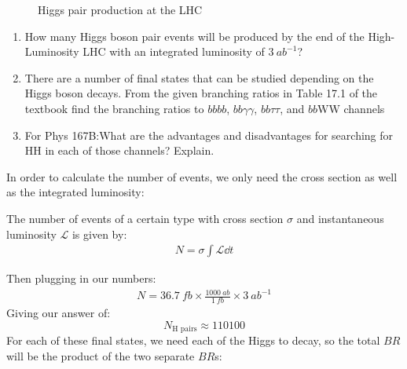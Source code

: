 \documentclass[12pt]{article}
\renewcommand{\L}{\mathcal{L}}
\newenvironment{thebook}
{\begin{mdframed}[style=defstyle,frametitle={From the Book}]}{\end{mdframed}}
\numberwithin{equation}{section}
\begin{document}
\begin{problem}
\begin{figure}[H]
    \caption{Higgs pair production at the LHC}\label{fig:t1}
  \end{figure}
  \begin{enumerate}
  \item How many Higgs boson pair events  will be produced by the end of the High-Luminosity LHC with an integrated luminosity of $\SI{3}{ab^{-1}}$?
  \item There are a number of final states that can be studied depending on the Higgs boson  decays. From the given branching ratios in Table 17.1 of the textbook find the branching ratios to $bbbb$, $bb\gamma\gamma$, $bb\tau\tau$, and $bb\mathrm{WW}$ channels
  \item For Phys 167B:\@ What are the advantages and disadvantages for searching for $\mathrm{HH}$ in each of those channels? Explain.
  \end{enumerate}
\end{problem}
In order to calculate the number of events, we only need the cross section as well as the integrated luminosity:
\begin{thebook}
  The number of events of a certain type with cross section $\sigma$ and instantaneous luminosity $\L$ is given by:
  \begin{align*}
    N=\sigma\int\L\dd{t}
  \end{align*}
\end{thebook}
Then plugging in our numbers:
\begin{align*}
  N=\SI{36.7}{fb}\times\frac{\SI{1000}{ab}}{\SI{1}{fb}}
  \times\SI{3}{ab^{-1}}
\end{align*}
Giving our answer of:
\begin{equation}
  \label{eq:t11}
  \boxed{N_{\mathrm{H}\text{ pairs}}\approx 110100}
\end{equation}
For each of these final states, we need each of the Higgs to decay, so the total $BR$ will be the product of the two separate $BR$s:
\end{document}
